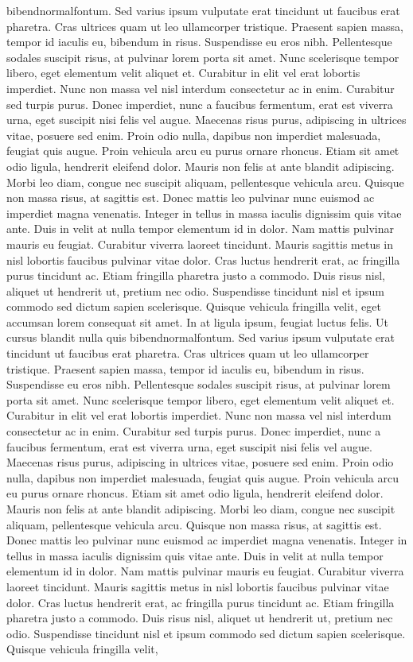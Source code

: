 \documentclass[letterpaper, twoside, 12pt, memoire, creativecommons, hyperref]{thETS}
\begin{document}
\begin{introduction}
bibendnormalfontum. Sed varius ipsum vulputate erat tincidunt ut faucibus erat pharetra. Cras ultrices quam ut leo ullamcorper tristique. Praesent sapien massa, tempor id iaculis eu, bibendum in risus. Suspendisse eu eros nibh. Pellentesque sodales suscipit risus, at pulvinar lorem porta sit amet. Nunc scelerisque tempor libero, eget elementum velit aliquet et. Curabitur in elit vel erat lobortis imperdiet. Nunc non massa vel nisl interdum consectetur ac in enim. Curabitur sed turpis purus. Donec imperdiet, nunc a faucibus fermentum, erat est viverra urna, eget suscipit nisi felis vel augue. Maecenas risus purus, adipiscing in ultrices vitae, posuere sed enim. Proin odio nulla, dapibus non imperdiet malesuada, feugiat quis augue. Proin vehicula arcu eu purus ornare rhoncus. Etiam sit amet odio ligula, hendrerit eleifend dolor. Mauris non felis at ante blandit adipiscing. Morbi leo diam, congue nec suscipit aliquam, pellentesque vehicula arcu. Quisque non massa risus, at sagittis est. Donec mattis leo pulvinar nunc euismod ac imperdiet magna venenatis. Integer in tellus in massa iaculis dignissim quis vitae ante. Duis in velit at nulla tempor elementum id in dolor. Nam mattis pulvinar mauris eu feugiat. Curabitur viverra laoreet tincidunt. Mauris sagittis metus in nisl lobortis faucibus pulvinar vitae dolor. Cras luctus hendrerit erat, ac fringilla purus tincidunt ac. Etiam fringilla pharetra justo a commodo. Duis risus nisl, aliquet ut hendrerit ut, pretium nec odio. Suspendisse tincidunt nisl et ipsum commodo sed dictum sapien scelerisque. Quisque vehicula fringilla velit, eget accumsan lorem consequat sit amet. In at ligula ipsum, feugiat luctus felis. Ut cursus blandit nulla quis bibendnormalfontum. Sed varius ipsum vulputate erat tincidunt ut faucibus erat pharetra. Cras ultrices quam ut leo ullamcorper tristique. Praesent sapien massa, tempor id iaculis eu, bibendum in risus. Suspendisse eu eros nibh. Pellentesque sodales suscipit risus, at pulvinar lorem porta sit amet. Nunc scelerisque tempor libero, eget elementum velit aliquet et. Curabitur in elit vel erat lobortis imperdiet. Nunc non massa vel nisl interdum consectetur ac in enim. Curabitur sed turpis purus. Donec imperdiet, nunc a faucibus fermentum, erat est viverra urna, eget suscipit nisi felis vel augue. Maecenas risus purus, adipiscing in ultrices vitae, posuere sed enim. Proin odio nulla, dapibus non imperdiet malesuada, feugiat quis augue. Proin vehicula arcu eu purus ornare rhoncus. Etiam sit amet odio ligula, hendrerit eleifend dolor. Mauris non felis at ante blandit adipiscing. Morbi leo diam, congue nec suscipit aliquam, pellentesque vehicula arcu. Quisque non massa risus, at sagittis est. Donec mattis leo pulvinar nunc euismod ac imperdiet magna venenatis. Integer in tellus in massa iaculis dignissim quis vitae ante. Duis in velit at nulla tempor elementum id in dolor. Nam mattis pulvinar mauris eu feugiat. Curabitur viverra laoreet tincidunt. Mauris sagittis metus in nisl lobortis faucibus pulvinar vitae dolor. Cras luctus hendrerit erat, ac fringilla purus tincidunt ac. Etiam fringilla pharetra justo a commodo. Duis risus nisl, aliquet ut hendrerit ut, pretium nec odio. Suspendisse tincidunt nisl et ipsum commodo sed dictum sapien scelerisque. Quisque vehicula fringilla velit, 
\end{introduction}
\end{document}
